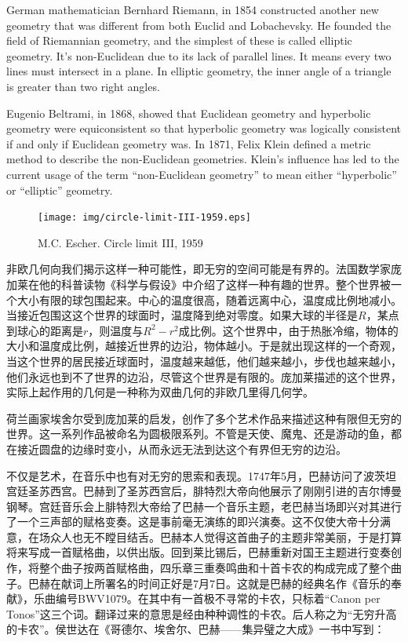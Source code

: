 \documentclass{article}
\begin{document}
German mathematician Bernhard Riemann, in 1854 constructed another new geometry that was different from both Euclid and Lobachevsky. He founded the field of Riemannian geometry, and the simplest of these is called elliptic geometry. It's non-Euclidean due to its lack of parallel lines. It means every two lines must intersect in a plane. In elliptic geometry, the inner angle of a triangle is greater than two right angles.

Eugenio Beltrami, in 1868, showed that Euclidean geometry and hyperbolic geometry were equiconsistent so that hyperbolic geometry was logically consistent if and only if Euclidean geometry was. In 1871, Felix Klein defined a metric method to describe the non-Euclidean geometries. Klein's influence has led to the current usage of the term ``non-Euclidean geometry'' to mean either ``hyperbolic'' or ``elliptic'' geometry.

\begin{figure}[htbp]
 \centering
 \texttt{[image: img/circle-limit-III-1959.eps]}
 \captionsetup{labelformat=empty}
 \caption{M.C. Escher. Circle limit III, 1959}
 \label{fig:circle-limit-3}
\end{figure}

非欧几何向我们揭示这样一种可能性，即无穷的空间可能是有界的。法国数学家庞加莱在他的科普读物《科学与假设》中介绍了这样一种有趣的世界。整个世界被一个大小有限的球包围起来。中心的温度很高，随着远离中心，温度成比例地减小。当接近包围这这个世界的球面时，温度降到绝对零度。如果大球的半径是$R$，某点到球心的距离是$r$，则温度与$R^2 - r^2$成比例。这个世界中，由于热胀冷缩，物体的大小和温度成比例，越接近世界的边沿，物体越小。于是就出现这样的一个奇观，当这个世界的居民接近球面时，温度越来越低，他们越来越小，步伐也越来越小，他们永远也到不了世界的边沿，尽管这个世界是有限的。庞加莱描述的这个世界，实际上起作用的几何是一种称为双曲几何的非欧几里得几何学。

荷兰画家埃舍尔受到庞加莱的启发，创作了多个艺术作品来描述这种有限但无穷的世界。这一系列作品被命名为圆极限系列。不管是天使、魔鬼、还是游动的鱼，都在接近圆盘的边缘时变小，从而永远无法到达这个有界但无穷的边沿。

不仅是艺术，在音乐中也有对无穷的思索和表现。1747年5月，巴赫访问了波茨坦宫廷圣苏西宫。巴赫到了圣苏西宫后，腓特烈大帝向他展示了刚刚引进的吉尔博曼钢琴。宫廷音乐会上腓特烈大帝给了巴赫一个音乐主题，老巴赫当场即兴对其进行了一个三声部的赋格变奏。这是事前毫无演练的即兴演奏。这不仅使大帝十分满意，在场众人也无不瞠目结舌。巴赫本人觉得这首曲子的主题非常美丽，于是打算将来写成一首赋格曲，以供出版。回到莱比锡后，巴赫重新对国王主题进行变奏创作，将整个曲子按两首赋格曲，四乐章三重奏鸣曲和十首卡农的构成完成了整个曲子。巴赫在献词上所署名的时间正好是7月7日。这就是巴赫的经典名作《音乐的奉献》，乐曲编号BWV1079。在其中有一首极不寻常的卡农，只标着“Canon per Tonos”这三个词。翻译过来的意思是经由种种调性的卡农。后人称之为“无穷升高的卡农”。侯世达在《哥德尔、埃舍尔、巴赫——集异璧之大成》一书中写到：
\end{document}
